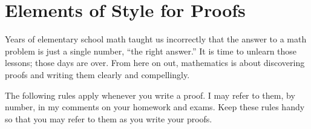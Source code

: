 \chapter{Elements of Style for Proofs}
\label{appendix:elements_of_style}
\thispagestyle{empty}

Years of elementary school math taught us incorrectly that the answer to a math problem is just a single number, ``the right answer.''  It is time to unlearn those lessons; those days are over.  From here on out, mathematics is about discovering proofs and writing them clearly and compellingly.

The following rules apply whenever you write a proof.  I may refer to them, by number, in my comments on your homework and exams.  Keep these rules handy so that you may refer to them as you write your proofs.

